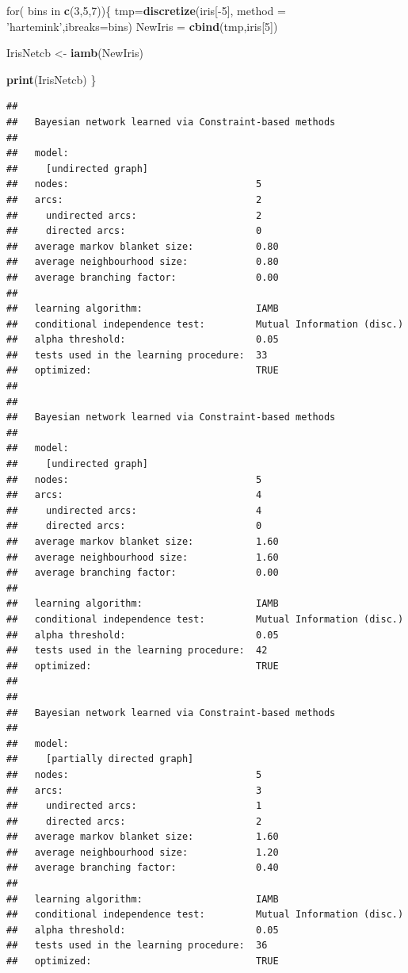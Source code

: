 \documentclass[]{article}
\newenvironment{Shaded}{\begin{snugshade}}{\end{snugshade}}
\newcommand{\KeywordTok}[1]{\textcolor[rgb]{0.13,0.29,0.53}{\textbf{{#1}}}}
\newcommand{\DataTypeTok}[1]{\textcolor[rgb]{0.13,0.29,0.53}{{#1}}}
\newcommand{\DecValTok}[1]{\textcolor[rgb]{0.00,0.00,0.81}{{#1}}}
\newcommand{\StringTok}[1]{\textcolor[rgb]{0.31,0.60,0.02}{{#1}}}
\newcommand{\NormalTok}[1]{{#1}}
\begin{document}
\begin{Shaded}
\begin{Highlighting}[]
\NormalTok{for( bins in }\KeywordTok{c}\NormalTok{(}\DecValTok{3}\NormalTok{,}\DecValTok{5}\NormalTok{,}\DecValTok{7}\NormalTok{))\{}
\NormalTok{tmp=}\KeywordTok{discretize}\NormalTok{(iris[-}\DecValTok{5}\NormalTok{], }\DataTypeTok{method =} \StringTok{'hartemink'}\NormalTok{,}\DataTypeTok{ibreaks=}\NormalTok{bins) }
\NormalTok{NewIris =}\StringTok{ }\KeywordTok{cbind}\NormalTok{(tmp,iris[}\DecValTok{5}\NormalTok{]) }

\NormalTok{IrisNetcb <-}\StringTok{ }\KeywordTok{iamb}\NormalTok{(NewIris)}

\KeywordTok{print}\NormalTok{(IrisNetcb)}
\NormalTok{\}}
\end{Highlighting}
\end{Shaded}

\begin{verbatim}
## 
##   Bayesian network learned via Constraint-based methods
## 
##   model:
##     [undirected graph]
##   nodes:                                 5 
##   arcs:                                  2 
##     undirected arcs:                     2 
##     directed arcs:                       0 
##   average markov blanket size:           0.80 
##   average neighbourhood size:            0.80 
##   average branching factor:              0.00 
## 
##   learning algorithm:                    IAMB 
##   conditional independence test:         Mutual Information (disc.) 
##   alpha threshold:                       0.05 
##   tests used in the learning procedure:  33 
##   optimized:                             TRUE 
## 
## 
##   Bayesian network learned via Constraint-based methods
## 
##   model:
##     [undirected graph]
##   nodes:                                 5 
##   arcs:                                  4 
##     undirected arcs:                     4 
##     directed arcs:                       0 
##   average markov blanket size:           1.60 
##   average neighbourhood size:            1.60 
##   average branching factor:              0.00 
## 
##   learning algorithm:                    IAMB 
##   conditional independence test:         Mutual Information (disc.) 
##   alpha threshold:                       0.05 
##   tests used in the learning procedure:  42 
##   optimized:                             TRUE 
## 
## 
##   Bayesian network learned via Constraint-based methods
## 
##   model:
##     [partially directed graph]
##   nodes:                                 5 
##   arcs:                                  3 
##     undirected arcs:                     1 
##     directed arcs:                       2 
##   average markov blanket size:           1.60 
##   average neighbourhood size:            1.20 
##   average branching factor:              0.40 
## 
##   learning algorithm:                    IAMB 
##   conditional independence test:         Mutual Information (disc.) 
##   alpha threshold:                       0.05 
##   tests used in the learning procedure:  36 
##   optimized:                             TRUE
\end{verbatim}
\end{document}
